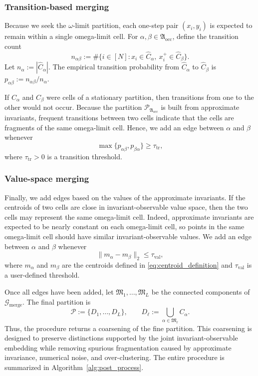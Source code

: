\documentclass[letterpaper, 10 pt, conference]{ieeeconf}
\newcommand{\Gc}{\mathcal{G}}
\newcommand{\Pc}{\mathcal{P}}
\begin{document}
\subsubsection{Transition-based merging}
Because we seek the $\omega$-limit partition, each one-step pair $(x_i,y_i)$ is expected to remain within a single omega-limit cell. For $\alpha,\beta\in\mathfrak A_{\text{occ}}$, define the transition count
\begin{equation}
    n_{\alpha\beta} := \#\{i\in[N]:x_i\in \widehat C_\alpha, \ x_i^+\in \widehat C_\beta\}.
\end{equation}
Let $n_\alpha:=|\widehat C_\alpha|$. The empirical transition probability from $\widehat C_\alpha$ to $\widehat C_\beta$ is $p_{\alpha\beta} :={n_{\alpha\beta}}/{n_\alpha}$. 

If $C_\alpha$ and $C_\beta$ were cells of a stationary partition, then transitions from one to the other would not occur. Because the partition $\Pc_{\mathfrak A_{\text{occ}}}$ is built from approximate invariants, frequent transitions between two cells indicate that the cells are fragments of the same omega-limit cell. Hence, we add an edge between $\alpha$ and $\beta$ whenever
\begin{equation}
    \max\{p_{\alpha\beta},p_{\beta\alpha}\}
    \geq \tau_{\text{tr}},
    \label{eq:transition_merge_rule}
\end{equation}
where $\tau_{\text{tr}}>0$ is a transition threshold.

\subsubsection{Value-space merging}
Finally, we add edges based on the values of the approximate invariants. If the centroids of two cells are close in invariant-observable value space, then the two cells may represent the same omega-limit cell. Indeed, approximate invariants are expected to be nearly constant on each omega-limit cell, so points in the same omega-limit cell should have similar invariant-observable values. We add an edge between $\alpha$ and $\beta$ whenever
\begin{equation}
    \|m_\alpha-m_\beta\|_2
    \leq \tau_{\text{val}},
    \label{eq:value_merge_rule}
\end{equation}
where $m_{\alpha}$ and $m_{\beta}$ are the centroids defined in \eqref{eq:centroid_definition} and $\tau_{\text{val}}$ is a user-defined threshold.

Once all edges have been added, let $\mathfrak M_1,\ldots,\mathfrak M_L$ be the connected components of $\Gc_{\text{merge}}$. The final partition is
\begin{equation}
    \Pc
    :=\{D_1,\ldots, D_L\},
    \qquad
    D_\ell
    :=\bigcup_{\alpha\in\mathfrak M_\ell} C_\alpha.
\end{equation}
Thus, the procedure returns a coarsening of the fine partition. This coarsening is designed to preserve distinctions supported by the joint invariant-observable embedding while removing spurious fragmentation caused by approximate invariance, numerical noise, and over-clustering. The entire procedure is summarized in Algorithm~\ref{alg:post_process}.
\end{document}
